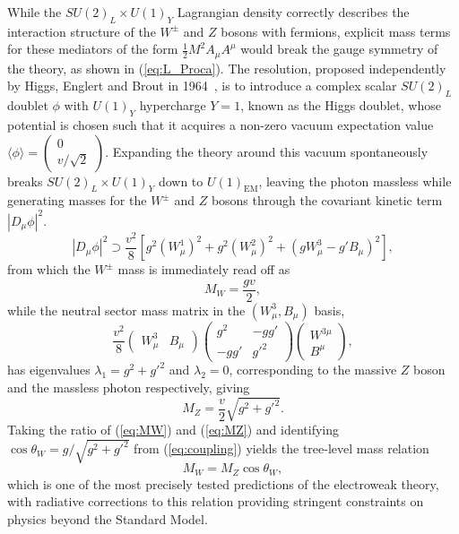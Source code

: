 While the $SU(2)_L \times U(1)_Y$ Lagrangian density correctly describes the interaction structure of the $W^\pm$ and $Z$ bosons with fermions, explicit mass terms for these mediators of the form $\frac{1}{2}M^2 A_\mu A^\mu$ would break the gauge symmetry of the theory, as shown in (\ref{eq:L_Proca}). The resolution, proposed independently by Higgs, Englert and Brout in 1964~\cite{Higgs1964, EnglertBrout1964, PhysRevLett.13.585}, is to introduce a complex scalar $SU(2)_L$ doublet $\phi$ with $U(1)_Y$ hypercharge $Y=1$, known as the Higgs doublet, whose potential is chosen such that it acquires a non-zero vacuum expectation value $\langle\phi\rangle = \left(\begin{smallmatrix}0 \\ v/\sqrt{2}\end{smallmatrix}\right)$. Expanding the theory around this vacuum spontaneously breaks $SU(2)_L \times U(1)_Y$ down to $U(1)_{\text{EM}}$, leaving the photon massless while generating masses for the $W^\pm$ and $Z$ bosons through the covariant kinetic term $|D_\mu\phi|^2$.
\begin{equation}
|D_\mu\phi|^2 \supset \frac{v^2}{8}\left[g^2(W^1_\mu)^2 + g^2(W^2_\mu)^2 + \left(gW^3_\mu - g'B_\mu\right)^2\right],
\end{equation}
from which the $W^\pm$ mass is immediately read off as
\begin{equation}\label{eq:MW}
M_W = \frac{gv}{2},
\end{equation}
while the neutral sector mass matrix in the $(W^3_\mu, B_\mu)$ basis,
\begin{equation}
\frac{v^2}{8}\begin{pmatrix}W^3_\mu & B_\mu\end{pmatrix}\begin{pmatrix}g^2 & -gg' \\ -gg' & g'^2\end{pmatrix}\begin{pmatrix}W^{3\mu} \\ B^\mu\end{pmatrix},
\end{equation}
has eigenvalues $\lambda_1 = g^2 + g'^2$ and $\lambda_2 = 0$, corresponding to the massive $Z$ boson and the massless photon respectively, giving
\begin{equation}\label{eq:MZ}
M_Z = \frac{v}{2}\sqrt{g^2 + g'^2}.
\end{equation}
Taking the ratio of (\ref{eq:MW}) and (\ref{eq:MZ}) and identifying $\cos\theta_W = g/\sqrt{g^2+g'^2}$ from (\ref{eq:coupling}) yields the tree-level mass relation
\begin{equation}\label{eq:MWMZrelation}
M_W = M_Z\cos\theta_W,
\end{equation}
which is one of the most precisely tested predictions of the electroweak theory, with radiative corrections to this relation providing stringent constraints on physics beyond the Standard Model.

